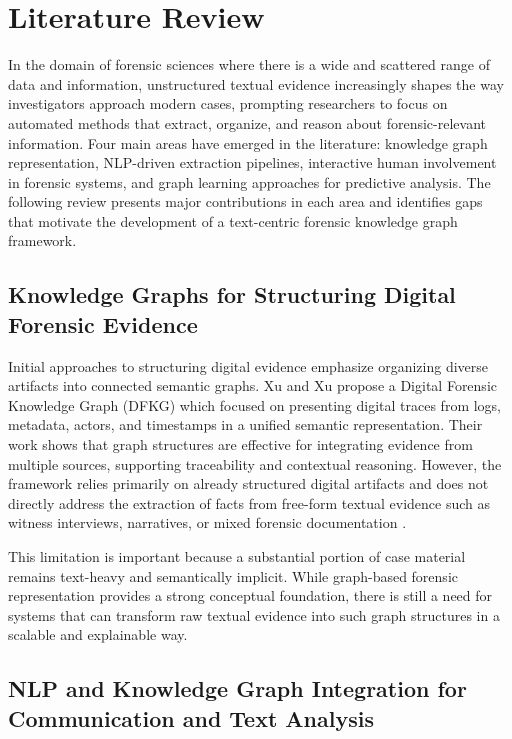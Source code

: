 \documentclass{ieeeaccess}
\begin{document}
\section{Literature Review}

In the domain of forensic sciences where there is a wide and scattered range of data and information, unstructured textual evidence increasingly shapes the way investigators approach modern cases, prompting researchers to focus on automated methods that extract, organize, and reason about forensic-relevant information. Four main areas have emerged in the literature: knowledge graph representation, NLP-driven extraction pipelines, interactive human involvement in forensic systems, and graph learning approaches for predictive analysis. The following review presents major contributions in each area and identifies gaps that motivate the development of a text-centric forensic knowledge graph framework.

\subsection{Knowledge Graphs for Structuring Digital Forensic Evidence}

Initial approaches to structuring digital evidence emphasize organizing diverse artifacts into connected semantic graphs. Xu and Xu propose a Digital Forensic Knowledge Graph (DFKG) which focused on presenting digital traces from logs, metadata, actors, and timestamps in a unified semantic representation. Their work shows that graph structures are effective for integrating evidence from multiple sources, supporting traceability and contextual reasoning. However, the framework relies primarily on already structured digital artifacts and does not directly address the extraction of facts from free-form textual evidence such as witness interviews, narratives, or mixed forensic documentation \cite{xu2018dfkg}.

This limitation is important because a substantial portion of case material remains text-heavy and semantically implicit. While graph-based forensic representation provides a strong conceptual foundation, there is still a need for systems that can transform raw textual evidence into such graph structures in a scalable and explainable way.

\subsection{NLP and Knowledge Graph Integration for Communication and Text Analysis}
\end{document}
